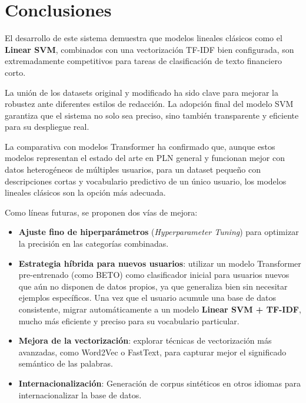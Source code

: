 \section{Conclusiones}
\label{sec:conclusiones}

El desarrollo de este sistema demuestra que modelos lineales clásicos como el \textbf{Linear SVM}, combinados con una vectorización TF-IDF bien configurada, son extremadamente competitivos para tareas de clasificación de texto financiero corto. 

La unión de los datasets original y modificado ha sido clave para mejorar la robustez ante diferentes estilos de redacción. La adopción final del modelo SVM garantiza que el sistema no solo sea preciso, sino también transparente y eficiente para su despliegue real.

La comparativa con modelos Transformer ha confirmado que, aunque estos modelos representan el estado del arte en PLN general y funcionan mejor con datos heterogéneos de múltiples usuarios, para un dataset pequeño con descripciones cortas y vocabulario predictivo de un único usuario, los modelos lineales clásicos son la opción más adecuada.

Como líneas futuras, se proponen dos vías de mejora:
\begin{itemize}
    \item \textbf{Ajuste fino de hiperparámetros} (\textit{Hyperparameter Tuning}) para optimizar la precisión en las categorías combinadas.
    \item \textbf{Estrategia híbrida para nuevos usuarios}: utilizar un modelo Transformer pre-entrenado (como BETO) como clasificador inicial para usuarios nuevos que aún no disponen de datos propios, ya que generaliza bien sin necesitar ejemplos específicos. Una vez que el usuario acumule una base de datos consistente, migrar automáticamente a un modelo \textbf{Linear SVM + TF-IDF}, mucho más eficiente y preciso para su vocabulario particular.
    \item \textbf{Mejora de la vectorización}: explorar técnicas de vectorización más avanzadas, como Word2Vec o FastText, para capturar mejor el significado semántico de las palabras.
    \item \textbf{Internacionalización}: Generación de corpus sintéticos en otros idiomas para internacionalizar la base de datos.
\end{itemize}
